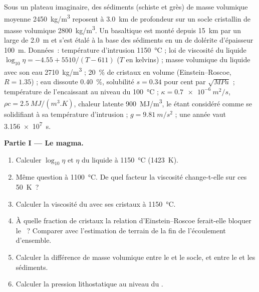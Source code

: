\begin{problem}
\label{pb:b2:magma-emplacement:1}
Sous un plateau imaginaire, des sédiments (schiste et grès) de masse volumique moyenne
\qty{2450}{kg/m^3} reposent à \qty{3.0}{km} de profondeur sur un socle cristallin de
masse volumique \qty{2800}{kg/m^3}. Un  basaltique est monté depuis \qty{15}{km} par un 
large de \qty{2.0}{m} et s'est étalé à la base des sédiments en un  de dolérite
d'épaisseur \qty{100}{m}. Données~: température d'intrusion \qty{1150}{\celsius} ; loi de viscosité du liquide
$\log_{10}\eta = -4.55 + 5510/(T - 611)$ ($T$ en kelvins) ; masse volumique du liquide
avec son eau \qty{2710}{kg/m^3} ; \qty{20}{\percent} de cristaux en volume
(Einstein--Roscoe, $R = 1.35$) ; eau dissoute \qty{0.40}{\percent}, solubilité
$s = 0.34$ pour cent par $\sqrt{\unit{MPa}}$ ; température de l'encaissant au niveau du 
\qty{100}{\celsius} ; $\kappa = \qty{0.7e-6}{m^2/s}$, $\rho c = \qty{2.5}{MJ/(m^3.K)}$,
chaleur latente \qty{900}{MJ/m^3}, le  étant considéré comme se solidifiant à sa
température d'intrusion ; $g = \qty{9.81}{m/s^2}$ ; une année vaut \qty{3.156e7}{s}.

\medskip\noindent\textbf{Partie I --- Le magma.}
\begin{enumerate}
\item Calculer $\log_{10}\eta$ et $\eta$ du liquide à \qty{1150}{\celsius}
(\qty{1423}{K}).
\item Même question à \qty{1100}{\celsius}. De quel facteur la viscosité change-t-elle sur
ces \qty{50}{K}~?
\item Calculer la viscosité du  avec ses cristaux à
\qty{1150}{\celsius}.
\item À quelle fraction de cristaux la relation d'Einstein--Roscoe ferait-elle
bloquer le ~? Comparer avec l'estimation de terrain de la fin de l'écoulement d'ensemble.
\item Calculer la différence de masse volumique entre le  et le socle, et entre le  et
les sédiments.
\item Calculer la pression lithostatique au niveau du .
\end{enumerate}


\end{problem}
